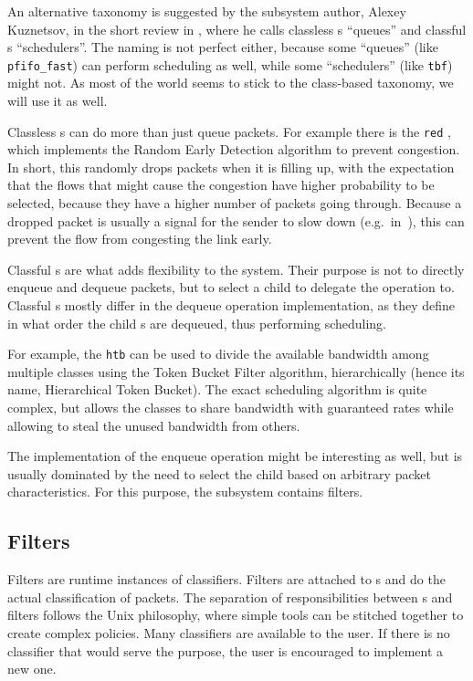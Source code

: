 An alternative \qdisc{} taxonomy is suggested by the subsystem author, Alexey
Kuznetsov, in the short review in , where he
calls classless \qdisc{}s ``queues'' and classful \qdisc{}s
``schedulers''. The naming is not perfect either, because some ``queues'' (like
\texttt{pfifo\_fast}) can perform scheduling as well, while some ``schedulers''
(like \texttt{tbf}) might not. As most of the world seems to stick to the
class-based taxonomy, we will use it as well.

Classless \qdisc{}s can do more than just queue packets. For example there is the
\texttt{red} \qdisc{}, which implements the Random Early Detection algorithm to
prevent congestion. In short, this \qdisc{} randomly drops packets when it is
filling up, with the expectation that the flows that might cause the congestion
have higher probability to be selected, because they have a higher number of
packets going through. Because a dropped packet is usually a signal for the sender to
slow down (e.g.~in~), this can prevent the flow from congesting the link
early.

Classful \qdisc{}s are what adds flexibility to the system. Their purpose is not
to directly enqueue and dequeue packets, but to select a child \qdisc{} to
delegate the operation to. Classful \qdisc{}s mostly differ in the dequeue
operation implementation, as they define in what order the child \qdisc{}s are
dequeued, thus performing scheduling.

For example, the \texttt{htb} \qdisc{} can be used to divide the available
bandwidth among multiple classes using the Token Bucket Filter algorithm,
hierarchically (hence its name, Hierarchical Token Bucket). The exact scheduling
algorithm is quite complex, but allows the classes to share bandwidth with
guaranteed rates while allowing to steal the unused bandwidth from others.

The implementation of the enqueue operation might be interesting as well, but
is usually dominated by the need to select the child \qdisc{} based on
arbitrary packet characteristics. For this purpose, the  subsystem
contains filters.

\subsection{Filters}

Filters are runtime instances of classifiers. Filters are attached to \qdisc{}s
and do the actual classification of packets. The separation of responsibilities between
\qdisc{}s and filters follows the Unix philosophy, where simple tools can
be stitched together to create complex policies. Many classifiers are
available to the user. If there is no classifier that would serve
the purpose, the user is encouraged to implement a new one.

